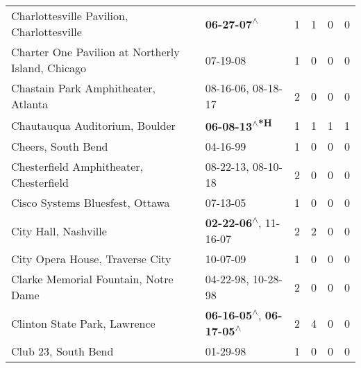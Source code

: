 \begin{supertabular}{p{0.4\textwidth}p{0.3\textwidth}p{0.05\textwidth}p{0.05\textwidth}p{0.05\textwidth}p{0.05\textwidth}}
                                    Charlottesville Pavilion, Charlottesville &                                                 \textbf{06-27-07\textsuperscript{$\wedge$}} &  1 &  1 &  0 &  0 \\
                            Charter One Pavilion at Northerly Island, Chicago &                                                                  07-19-08\textsuperscript{} &  1 &  0 &  0 &  0 \\
                                          Chastain Park Amphitheater, Atlanta &                                      08-16-06\textsuperscript{}, 08-18-17\textsuperscript{} &  2 &  0 &  0 &  0 \\
                                               Chautauqua Auditorium, Boulder &                                               \textbf{06-08-13\textsuperscript{$\wedge$*H}} &  1 &  1 &  1 &  1 \\
                                                           Cheers, South Bend &                                                                  04-16-99\textsuperscript{} &  1 &  0 &  0 &  0 \\
                                      Chesterfield Amphitheater, Chesterfield &                                      08-22-13\textsuperscript{}, 08-10-18\textsuperscript{} &  2 &  0 &  0 &  0 \\
                                              Cisco Systems Bluesfest, Ottawa &                                                                  07-13-05\textsuperscript{} &  1 &  0 &  0 &  0 \\
                                                         City Hall, Nashville &                     \textbf{02-22-06\textsuperscript{$\wedge$}}, 11-16-07\textsuperscript{} &  2 &  2 &  0 &  0 \\
                                              City Opera House, Traverse City &                                                                  10-07-09\textsuperscript{} &  1 &  0 &  0 &  0 \\
                                         Clarke Memorial Fountain, Notre Dame &                                      04-22-98\textsuperscript{}, 10-28-98\textsuperscript{} &  2 &  0 &  0 &  0 \\
                                                 Clinton State Park, Lawrence &    \textbf{06-16-05\textsuperscript{$\wedge$}}, \textbf{06-17-05\textsuperscript{$\wedge$}} &  2 &  4 &  0 &  0 \\
                                                          Club 23, South Bend &                                                                  01-29-98\textsuperscript{} &  1 &  0 &  0 &  0 \\

\end{supertabular}
